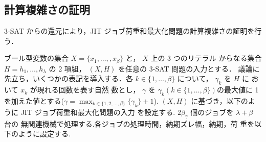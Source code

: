 \documentclass[12pt]{optlab-bachelor}
\begin{document}
\subsection{計算複雑さの証明}
\textsc{3-SAT} からの還元により，JIT ジョブ荷重和最大化問題の計算複雑さの証明を行う．

ブール型変数の集合 $X = \{x_1,\ldots,,x_β\}$ と， $X$ 上の 3 つのリテラル
からなる集合 $H = {h_1,\ldots,h_{\lambda}}$ の 2 項組， $(X,H)$ を任意の
\textsc{3-SAT} 問題の入力とする．
議論に先立ち，いくつかの表記を導入する．各 $k \in \{1,\ldots,\beta\}$
について， $\gamma_k$ を $H$ に おいて $x_k$ が現れる回数を表す自然
数とし， $\gamma$ を $\gamma_k ( k \in \{1,\ldots,\beta\} )$の最大値に
1 を加えた値とする($\displaystyle \gamma = \max_{k \in \{1,2,\ldots, \beta\}} \{\gamma_k \}+ 1$).
$(X, H)$ に基づき，以下のように JIT ジョブ荷重和最大化問題の入力
を設定する. $2\beta_{\gamma}$ 個のジョブを $\lambda + \beta$ 台の
無関連機械で処理する.各ジョブの処理時間，納期ズレ幅，納期，荷
重を以下のように設定する.
\end{document}
